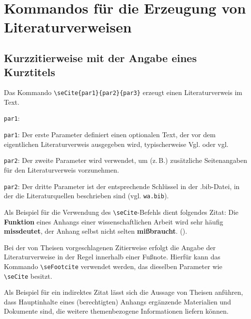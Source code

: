 %
%
%
\section{Kommandos f\"ur die Erzeugung von Literaturverweisen}

\subsection{Kurzzitierweise mit der Angabe eines Kurztitels}

Das Kommando \verb+\seCite{par1}{par2}{par3}+ erzeugt einen Literaturverweis im Text. 

\begin{seToplist}{\texttt{par1}:}
\item[\texttt{par1}:] Der erste Parameter  definiert einen optionalen Text, der vor dem eigentlichen Literaturverweis ausgegeben 
                               wird, typischerweise Vgl. oder vgl.
\item[\texttt{par2}:] Der zweite Parameter  wird verwendet, um (z.\,B.) zus\"atzliche Seitenangaben f\"ur den Literaturverweis 
                              vorzunehmen.
\item[\texttt{par2}:] Der dritte Parameter ist der entsprechende Schl\"ussel in der .bib-Datei, in der die Literaturquellen 
                              beschrieben sind (vgl. \texttt{wa.bib}).                                                                                       
\end{seToplist}

Als Beispiel f\"ur die Verwendung des \verb+\seCite+-Befehls dient folgendes Zitat: \glqq{}Die \textbf{Funktion} eines 
Anhangs einer wissenschaftlichen Arbeit wird sehr h\"aufig \textbf{missdeutet}, der Anhang selbst nicht selten \textbf{mi{\ss}braucht}.\grqq{} 
().

Bei der von Theisen vorgeschlagenen Zitierweise erfolgt die Angabe der Literaturverweise in der Regel innerhalb einer Fu{\ss}note. 
Hierf\"ur kann das Kommando \verb+\seFootcite+ verwendet werden, das dieselben Parameter wie \verb+\seCite+ besitzt. 

Als Beispiel f\"ur ein indirektes Zitat l\"asst sich die Aussage von Theisen anf\"uhren, dass Hauptinhalte eines (berechtigten) Anhangs erg\"anzende 
Materialien und Dokumente sind, die weitere themenbezogene Informationen liefern k\"onnen.

